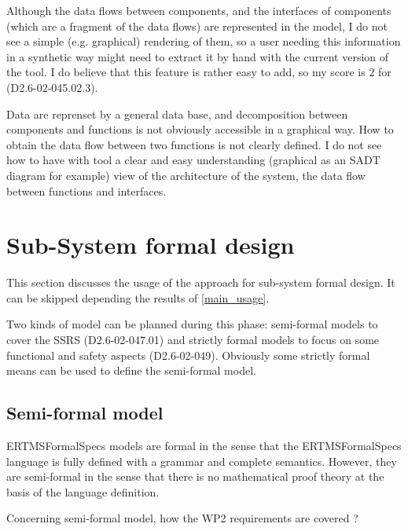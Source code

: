 \begin{assessor1}
Although the data flows between components, and the interfaces of components (which are a fragment of the data flows) are represented in the model, I do not see a simple (e.g. graphical) rendering of them, so a user needing this information in a synthetic way might need to extract it by hand with the current version of the tool. I do believe that this feature is rather easy to add, so my score is 2 for (D2.6-02-045.02.3). 
\end{assessor1}


\begin{assessor2}
Data are reprenset by a general data base, and decomposition between components and functions is not obviously  accessible in a graphical way. How to obtain the data flow between two  functions is not clearly defined.
I do not see how to have with tool a clear and easy understanding (graphical as an SADT diagram for example) view of the architecture of the system, the data flow between functions and interfaces.
\end{assessor2}

\section{Sub-System formal design}
This section discusses the usage of the approach for sub-system formal design.
It can be skipped depending the results of \ref{main_usage}.

Two kinds of model can be planned during this phase: semi-formal models to  cover the SSRS (D2.6-02-047.01) and strictly formal  models to  focus on some functional and safety aspects (D2.6-02-049). Obviously some strictly  formal means can be used to define the semi-formal  model.

\subsection{Semi-formal model}

\begin{author_comment}
ERTMSFormalSpecs models are formal in the sense that the ERTMSFormalSpecs language is fully defined with a grammar and complete semantics. However, they are semi-formal in the sense that there is no mathematical proof theory at the basis of the language definition.  
\end{author_comment}

Concerning semi-formal model, how the WP2 requirements are covered ?

